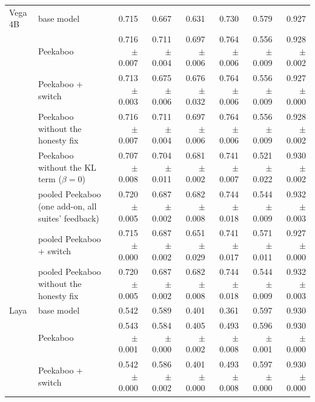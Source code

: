\begin{table}[tbp]
{\begin{tabular}{llrrrrrr}
Vega 4B & base model & 0.715 & 0.667 & 0.631 & 0.730 & 0.579 & 0.927 \\
 & Peekaboo & 0.716 {\scriptsize$\pm$0.007} & 0.711 {\scriptsize$\pm$0.004} & 0.697 {\scriptsize$\pm$0.006} & 0.764 {\scriptsize$\pm$0.006} & 0.556 {\scriptsize$\pm$0.009} & 0.928 {\scriptsize$\pm$0.002} \\
 & Peekaboo + switch & 0.713 {\scriptsize$\pm$0.003} & 0.675 {\scriptsize$\pm$0.006} & 0.676 {\scriptsize$\pm$0.032} & 0.764 {\scriptsize$\pm$0.006} & 0.556 {\scriptsize$\pm$0.009} & 0.927 {\scriptsize$\pm$0.000} \\
 & Peekaboo without the honesty fix & 0.716 {\scriptsize$\pm$0.007} & 0.711 {\scriptsize$\pm$0.004} & 0.697 {\scriptsize$\pm$0.006} & 0.764 {\scriptsize$\pm$0.006} & 0.556 {\scriptsize$\pm$0.009} & 0.928 {\scriptsize$\pm$0.002} \\
 & Peekaboo without the KL term ($\beta = 0$) & 0.707 {\scriptsize$\pm$0.008} & 0.704 {\scriptsize$\pm$0.011} & 0.681 {\scriptsize$\pm$0.002} & 0.741 {\scriptsize$\pm$0.007} & 0.521 {\scriptsize$\pm$0.022} & 0.930 {\scriptsize$\pm$0.002} \\
 & pooled Peekaboo (one add-on, all suites' feedback) & 0.720 {\scriptsize$\pm$0.005} & 0.687 {\scriptsize$\pm$0.002} & 0.682 {\scriptsize$\pm$0.008} & 0.744 {\scriptsize$\pm$0.018} & 0.544 {\scriptsize$\pm$0.009} & 0.932 {\scriptsize$\pm$0.003} \\
 & pooled Peekaboo + switch & 0.715 {\scriptsize$\pm$0.000} & 0.687 {\scriptsize$\pm$0.002} & 0.651 {\scriptsize$\pm$0.029} & 0.741 {\scriptsize$\pm$0.017} & 0.571 {\scriptsize$\pm$0.011} & 0.927 {\scriptsize$\pm$0.000} \\
 & pooled Peekaboo without the honesty fix & 0.720 {\scriptsize$\pm$0.005} & 0.687 {\scriptsize$\pm$0.002} & 0.682 {\scriptsize$\pm$0.008} & 0.744 {\scriptsize$\pm$0.018} & 0.544 {\scriptsize$\pm$0.009} & 0.932 {\scriptsize$\pm$0.003} \\
Laya & base model & 0.542 & 0.589 & 0.401 & 0.361 & 0.597 & 0.930 \\
 & Peekaboo & 0.543 {\scriptsize$\pm$0.001} & 0.584 {\scriptsize$\pm$0.000} & 0.405 {\scriptsize$\pm$0.002} & 0.493 {\scriptsize$\pm$0.008} & 0.596 {\scriptsize$\pm$0.001} & 0.930 {\scriptsize$\pm$0.000} \\
 & Peekaboo + switch & 0.542 {\scriptsize$\pm$0.000} & 0.586 {\scriptsize$\pm$0.002} & 0.401 {\scriptsize$\pm$0.000} & 0.493 {\scriptsize$\pm$0.008} & 0.597 {\scriptsize$\pm$0.000} & 0.930 {\scriptsize$\pm$0.000} \\

\end{tabular}}
\end{table}
